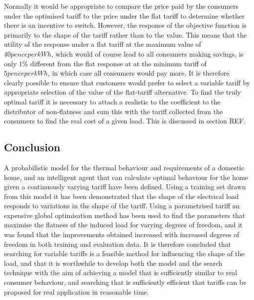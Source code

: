 \documentclass[a4paper, 10 pt, conference]{ieeeconf}  %
\begin{document}
Normally it would be appropriate to compare the price paid by the consumers under the optimised tariff to the price under the flat tariff to determine whether there is an incentive to switch. However, the response of the objective function is primarily to the shape of the tariff rather than to the value. This means that the utility of the response under a flat tariff at the maximum value of $40 pence per kWh$, which would of course lead to all consumers making savings, is only $1\%$ different from the flat response at at the minimum tariff of $5 pence per kWh$, in which case all consumers would pay more. It is therefore clearly possible to ensure that customers would prefer to select a variable tariff by appropriate selection of the value of the flat-tariff alternative. To find the truly optimal tariff it is necessary to attach a realistic to the coefficient to the distributor of non-flatness and sum this with the tariff collected from the consumers to find the real cost of a given load. This is discussed in section REF.

\subsection{Conclusion}
A probabilistic model for the thermal behaviour and requirements of a domestic home, and an intelligent agent that can calculate optimal behaviour for the home given a continuously varying tariff have been defined. Using a training set drawn from this model it has been demonstrated that the shape of the electrical load responds to variations in the shape of the tariff. Using a parametrised tariff an expensive global optimisation method has been used to find the parameters that maximise the flatness of the induced load for varying degrees of freedom, and it was found that the improvements obtained increased with increased degrees of freedom in both training and evaluation data. It is therefore concluded that searching for variable tariffs is a feasible method for influencing the shape of the load, and that it is worthwhile to develop both the model and the search technique with the aim of achieving a model that is sufficiently similar to real consumer behaviour, and searching that is sufficiently efficient that tariffs can be proposed for real application in reasonable time. 







\onecolumn
\large
\end{document}
